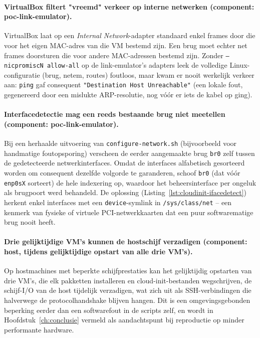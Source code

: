 \paragraph{VirtualBox filtert "vreemd" verkeer op interne netwerken (component:
poc-link-emulator).} VirtualBox laat op een \textit{Internal Network}-adapter standaard
enkel frames door die voor het eigen MAC-adres van die VM bestemd zijn. Een brug moet
echter net frames doorsturen die voor andere MAC-adressen bestemd zijn. Zonder
\texttt{--nicpromiscN allow-all} op de link-emulator's adapters leek de volledige
Linux-configuratie (brug, netem, routes) foutloos, maar kwam er nooit werkelijk verkeer
aan: \texttt{ping} gaf consequent \texttt{"Destination Host Unreachable"} (een lokale
fout, gegenereerd door een mislukte ARP-resolutie, nog vóór er iets de kabel op ging).

\paragraph{Interfacedetectie mag een reeds bestaande brug niet meetellen (component:
poc-link-emulator).} Bij een herhaalde uitvoering van \texttt{configure-network.sh}
(bijvoorbeeld voor handmatige foutopsporing) verscheen de eerder aangemaakte brug
\texttt{br0} zelf tussen de gedetecteerde netwerkinterfaces. Omdat de interfaces
alfabetisch gesorteerd worden om consequent dezelfde volgorde te garanderen, schoof
\texttt{br0} (dat vóór \texttt{enp0sX} sorteert) de hele indexering op, waardoor het
beheersinterface per ongeluk als brugpoort werd behandeld. De oplossing
(Listing~\ref{lst:cloudinit-ifacedetect}) herkent enkel interfaces met een
\texttt{device}-symlink in \texttt{/sys/class/net} -- een kenmerk van fysieke of
virtuele PCI-netwerkkaarten dat een puur softwarematige brug nooit heeft.

\paragraph{Drie gelijktijdige VM's kunnen de hostschijf verzadigen (component: host,
tijdens gelijktijdige opstart van alle drie VM's).} Op hostmachines met beperkte
schijfprestaties kan het gelijktijdig opstarten van drie VM's, die elk pakketten
installeren en cloud-init-bestanden wegschrijven, de schijf-I/O van de host tijdelijk
verzadigen, wat zich uit als SSH-verbindingen die halverwege de protocolhandshake blijven
hangen. Dit is een omgevingsgebonden beperking eerder dan een softwarefout in de scripts
zelf, en wordt in Hoofdstuk~\ref{ch:conclusie} vermeld als aandachtspunt bij reproductie
op minder performante hardware.

